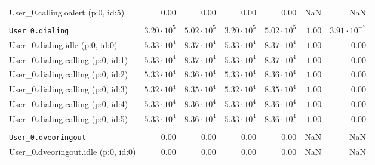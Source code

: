 \begin{table}[htbp]
{\begin{tabular}{lrrrrrr}
\hspace{3mm}User\_0.calling.oalert (p:0, id:5)       &              $0.00$ &              $0.00$ &              $0.00$ &              $0.00$ &                  NaN &                  NaN \\
\\[-8pt]\texttt{User\_0.dialing}                     & $3.20 \cdot 10^{5}$ & $5.02 \cdot 10^{5}$ & $3.20 \cdot 10^{5}$ & $5.02 \cdot 10^{5}$ &               $1.00$ & $3.91 \cdot 10^{-7}$ \\
\hspace{3mm}User\_0.dialing.idle (p:0, id:0)         & $5.33 \cdot 10^{4}$ & $8.37 \cdot 10^{4}$ & $5.33 \cdot 10^{4}$ & $8.37 \cdot 10^{4}$ &               $1.00$ &               $0.00$ \\
\hspace{3mm}User\_0.dialing.calling (p:0, id:1)      & $5.33 \cdot 10^{4}$ & $8.37 \cdot 10^{4}$ & $5.33 \cdot 10^{4}$ & $8.37 \cdot 10^{4}$ &               $1.00$ &               $0.00$ \\
\hspace{3mm}User\_0.dialing.calling (p:0, id:2)      & $5.33 \cdot 10^{4}$ & $8.36 \cdot 10^{4}$ & $5.33 \cdot 10^{4}$ & $8.36 \cdot 10^{4}$ &               $1.00$ &               $0.00$ \\
\hspace{3mm}User\_0.dialing.calling (p:0, id:3)      & $5.32 \cdot 10^{4}$ & $8.35 \cdot 10^{4}$ & $5.32 \cdot 10^{4}$ & $8.35 \cdot 10^{4}$ &               $1.00$ &               $0.00$ \\
\hspace{3mm}User\_0.dialing.calling (p:0, id:4)      & $5.33 \cdot 10^{4}$ & $8.36 \cdot 10^{4}$ & $5.33 \cdot 10^{4}$ & $8.36 \cdot 10^{4}$ &               $1.00$ &               $0.00$ \\
\hspace{3mm}User\_0.dialing.calling (p:0, id:5)      & $5.33 \cdot 10^{4}$ & $8.36 \cdot 10^{4}$ & $5.33 \cdot 10^{4}$ & $8.36 \cdot 10^{4}$ &               $1.00$ &               $0.00$ \\
\\[-8pt]\texttt{User\_0.dveoringout}                 &              $0.00$ &              $0.00$ &              $0.00$ &              $0.00$ &                  NaN &                  NaN \\
\hspace{3mm}User\_0.dveoringout.idle (p:0, id:0)     &              $0.00$ &              $0.00$ &              $0.00$ &              $0.00$ &                  NaN &                  NaN \\

\end{tabular}}
\end{table}
